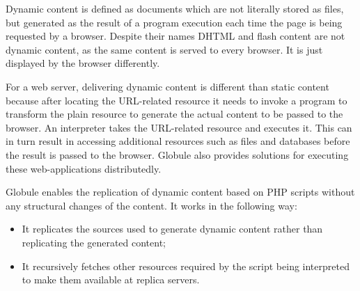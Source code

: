 \documentclass[10pt,a4paper]{article}
\makeatletter
\newenvironment{p}{\@open{P}{}}{\@close{P}}
\newenvironment{p}{}{\par}
\makeatother
\begin{document}
\begin{p}
Dynamic content is defined as documents which are not literally stored as
files, but generated as the result of a program execution each time the page
is being requested by a browser.  Despite their names DHTML and flash
content are not dynamic content, as the same content is served to every
browser.  It is just displayed by the browser differently.
\end{p}

\begin{p}
For a web server, delivering dynamic content is different than static content
because after locating the URL-related resource it needs to invoke a program
to transform the plain resource to generate the actual content to be passed to
the browser.  An interpreter takes the URL-related resource and executes it.
This can in turn result in accessing additional resources such as files and
databases before the result is passed to the browser.  Globule also provides
solutions for executing these web-applications distributedly.
\end{p}

\begin{p}
Globule enables the replication of dynamic content based on PHP scripts
without any structural changes of the content.  It works in the following way:
\end{p}

\begin{p}
\begin{itemize}
\item It replicates the sources used to generate dynamic content rather than
replicating the generated content;
\item It recursively fetches other resources required by the script being
interpreted to make them available at replica servers.
\end{itemize}
\end{p}
\end{document}

